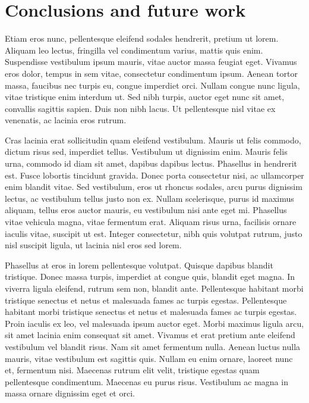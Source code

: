 \documentclass[final,5p,times,twocolumn]{elsarticle}
\begin{document}
\section{Conclusions and future work}
\label{sec:cf}

Etiam eros nunc, pellentesque eleifend sodales hendrerit, pretium ut lorem. Aliquam leo lectus, fringilla vel condimentum varius, mattis quis enim. Suspendisse vestibulum ipsum mauris, vitae auctor massa feugiat eget. Vivamus eros dolor, tempus in sem vitae, consectetur condimentum ipsum. Aenean tortor massa, faucibus nec turpis eu, congue imperdiet orci. Nullam congue nunc ligula, vitae tristique enim interdum ut. Sed nibh turpis, auctor eget nunc sit amet, convallis sagittis sapien. Duis non nibh lacus. Ut pellentesque nisl vitae ex venenatis, ac lacinia eros rutrum.

Cras lacinia erat sollicitudin quam eleifend vestibulum. Mauris ut felis commodo, dictum risus sed, imperdiet tellus. Vestibulum ut dignissim enim. Mauris felis urna, commodo id diam sit amet, dapibus dapibus lectus. Phasellus in hendrerit est. Fusce lobortis tincidunt gravida. Donec porta consectetur nisi, ac ullamcorper enim blandit vitae. Sed vestibulum, eros ut rhoncus sodales, arcu purus dignissim lectus, ac vestibulum tellus justo non ex. Nullam scelerisque, purus id maximus aliquam, tellus eros auctor mauris, eu vestibulum nisi ante eget mi. Phasellus vitae vehicula magna, vitae fermentum erat. Aliquam risus urna, facilisis ornare iaculis vitae, suscipit ut est. Integer consectetur, nibh quis volutpat rutrum, justo nisl suscipit ligula, ut lacinia nisl eros sed lorem.

Phasellus at eros in lorem pellentesque volutpat. Quisque dapibus blandit tristique. Donec massa turpis, imperdiet at congue quis, blandit eget magna. In viverra ligula eleifend, rutrum sem non, blandit ante. Pellentesque habitant morbi tristique senectus et netus et malesuada fames ac turpis egestas. Pellentesque habitant morbi tristique senectus et netus et malesuada fames ac turpis egestas. Proin iaculis ex leo, vel malesuada ipsum auctor eget. Morbi maximus ligula arcu, sit amet lacinia enim consequat sit amet. Vivamus et erat pretium ante eleifend vestibulum vel blandit risus. Nam sit amet fermentum nulla. Aenean luctus nulla mauris, vitae vestibulum est sagittis quis. Nullam eu enim ornare, laoreet nunc et, fermentum nisi. Maecenas rutrum elit velit, tristique egestas quam pellentesque condimentum. Maecenas eu purus risus. Vestibulum ac magna in massa ornare dignissim eget et orci.

\printbibliography %

\end{document}
